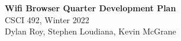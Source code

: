 \documentclass[11pt]{article}
\begin{document}
\begin{center}
  \textbf{\Large Wifi Browser Quarter Development Plan}\\\large CSCI 492, Winter 2022\\
  Dylan Roy, Stephen Loudiana, Kevin McGrane
\end{center}
\end{document}
